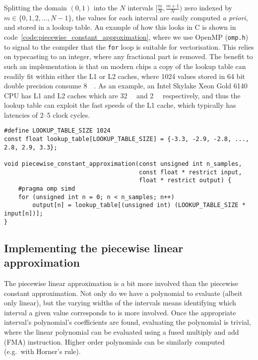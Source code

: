 \documentclass[manuscript,review]{acmart}
\begin{document}
Splitting the domain $ (0, 1) $ into the $ N $ intervals $ [\tfrac{m}{N}, \tfrac{m+1}{N}) $ zero indexed by $ m \in \{0,1,2,\ldots,N-1\}$, the values for each interval are easily computed \textit{a priori}, and stored in a lookup table. An example of how this looks in C is shown in code~\ref{code:piecewise_constant_approximation}, where we use OpenMP (\texttt{omp.h}) to signal to the compiler that the \texttt{for} loop is suitable for vectorisation. This relies on typecasting to an integer, where any fractional part is removed. The benefit to such an implementation is that on modern chips a copy of the lookup table can readily fit within either the L1 or L2 caches, where 1024 values stored in 64 bit double precision consume \SI{8}{\kilo\byte}. As an example, an Intel Skylake Xeon Gold 6140 CPU has L1 and L2 caches which are \SI{32}{\kilo\byte} and \SI{2}{\mega\byte} respectively, and thus the lookup table can exploit the fast speeds of the L1 cache, which typically has latencies of 2--5 clock cycles. 

\begin{lstfloat}[htb]
\begin{lstlisting}[style=C, caption={C implementation of the piecewise constant approximation.}, label={code:piecewise_constant_approximation}]
#define LOOKUP_TABLE_SIZE 1024
const float lookup_table[LOOKUP_TABLE_SIZE] = {-3.3, -2.9, -2.8, ..., 2.8, 2.9, 3.3};

void piecewise_constant_approximation(const unsigned int n_samples, 
                                      const float * restrict input, 
                                      float * restrict output) {
    #pragma omp simd
    for (unsigned int n = 0; n < n_samples; n++) 
        output[n] = lookup_table[(unsigned int) (LOOKUP_TABLE_SIZE * input[n])];
}
\end{lstlisting}
\end{lstfloat}

\subsection{Implementing the piecewise linear approximation}

The piecewise linear approximation is a bit more involved than the piecewise constant approximation. Not only do we have a polynomial to evaluate (albeit only linear), but the varying widths of the intervals means identifying which interval a given value corresponds to is more involved. Once the appropriate interval's polynomial's coefficients are found, evaluating the polynomial is trivial, where the linear polynomial can be evaluated using a fused multiply and add (FMA) instruction. Higher order polynomials can be similarly computed (e.g.\ with Horner's rule). 
\end{document}

